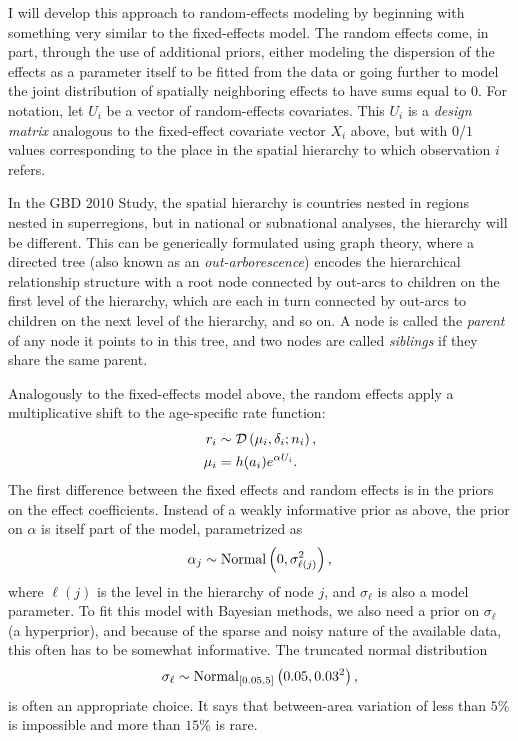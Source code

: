 I will develop this approach to random-effects modeling by beginning
with something very similar to the fixed-effects model.  The random
effects come, in part, through the use of additional priors, either
modeling the dispersion of the effects as a parameter itself to be
fitted from the data or going further to model the joint distribution of
spatially neighboring effects to have sums equal to $0$.  For
notation, let $U_i$ be a vector of random-effects covariates.  This
$U_i$ is a \emph{design matrix} analogous to the fixed-effect
covariate vector $X_i$ above, but with $0$/$1$ values corresponding
to the place in the spatial hierarchy to which observation $i$ refers.

In the GBD 2010 Study, the spatial hierarchy is countries nested in regions
nested in superregions, but in national or subnational analyses, the
hierarchy will be different. This can be generically formulated using
graph theory, where a directed tree (also known as an
\emph{out-arborescence}) encodes the hierarchical relationship
structure with a root node connected by out-arcs to children on the
first level of the hierarchy, which are each in turn connected by
out-arcs to children on the next level of the hierarchy, and so on.  A
node is called the \emph{parent} of any node it points to in this
tree, and two nodes are called \emph{siblings} if they share the same
parent.


Analogously to the fixed-effects model above, the random effects apply
a multiplicative shift to the age-specific rate function:
\begin{align*}
r_i &\sim \mathcal{D}\left(\mu_i, \delta_i; n_i\right),\\
\mu_i &= h(a_i)e^{\alpha U_i}.
\end{align*}
The first difference between the fixed effects and random effects is
in the priors on the effect coefficients.  Instead of a weakly
informative prior as above, the prior on $\alpha$ is itself part of
the model, parametrized as
\[
\alpha_j \sim \operatorname{Normal}\left(0, \sigma_{\ell(j)}^2\right),
\]
where $\ell(j)$ is the level in the hierarchy of node $j$, and
$\sigma_\ell$ is also a model parameter. To fit this model with
Bayesian methods, we also need a prior on $\sigma_\ell$ (a
hyperprior), and because of the sparse and noisy nature of the
available data, this often has to be somewhat informative.  The
truncated normal distribution
\[
\sigma_\ell \sim \operatorname{Normal}_{[0.05,5]}\left(0.05, 0.03^2\right),
\]
is often an appropriate choice. It says that between-area variation of
less than $5\%$ is impossible and more than $15\%$ is rare.

